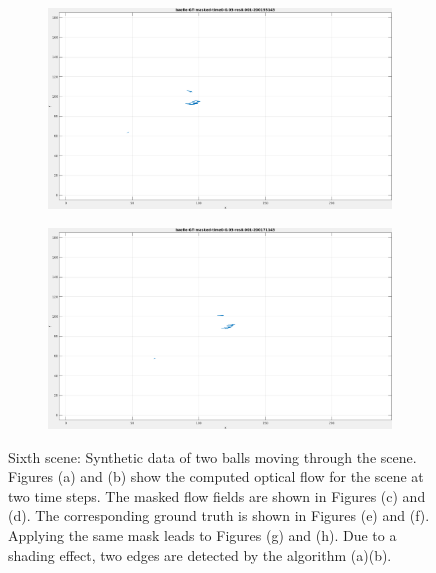 \begin{figure}[tb]
\begin{subfigure}{.45\textwidth}
  \caption{}
\end{subfigure}
\begin{subfigure}{.45\textwidth}
  \centering
  \includegraphics[height=.6\linewidth]{figs/baelle/baelle-GT-masked-1.png}
  \caption{}
\end{subfigure}
\begin{subfigure}{.45\textwidth}
  \centering
  \includegraphics[height=.6\linewidth]{figs/baelle/baelle-GT-masked-2.png}
  \caption{}
\end{subfigure}
\caption[Sixth scene: Synthetic data of two balls moving through the scene.]{Sixth scene: Synthetic data of two balls moving through the scene.
Figures (a) and (b) show the computed optical flow for the scene at two time steps. The masked flow fields are shown in Figures (c) and (d).
The corresponding ground truth is shown in Figures (e) and (f). Applying the same mask leads to Figures (g) and (h).
Due to a shading effect, two edges are detected by the algorithm (a)(b).}
\label{fig:baelle-snapshots}
\end{figure}

